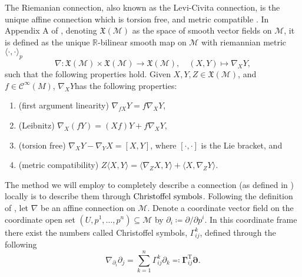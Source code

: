\begin{definition}\label{def:riemannian_connection}
    The \textup{Riemanian connection}, also known as the \textup{Levi-Civita connection}, is the unique affine connection which is torsion free, and metric compatible \cite[Def.~6.4]{Tu2017}. In Appendix A of \cite{JensenZimmermann2024}, denoting $\mathfrak{X}(\mathcal{M})$ as the space of smooth vector fields on $\mathcal{M}$, it is defined as the unique $\mathbb{R}$-bilinear smooth map on $\mathcal{M}$ with riemannian metric $\langle \cdot, \cdot\rangle_{p}$
    \begin{equation*}
        \nabla:\mathfrak{X}(\mathcal{M})\times \mathfrak{X}(\mathcal{M})\xrightarrow{}\mathfrak{X}(\mathcal{M}),\quad (X,Y)\mapsto \nabla_{X}Y,
    \end{equation*}
    such that the following properties hold. Given $X,Y,Z\in \mathfrak{X}(\mathcal{M})$, and $f\in \mathcal{C}^{\infty}(M)$, $\nabla_{X}Y$has the following properties:
    \begin{enumerate}
        \item (first argument linearity) $\nabla_{fX}Y=f \nabla_{X}Y$, 
        \item {}(Leibnitz) $\nabla_{X}(fY)=(Xf)Y+f \nabla_{X}Y$, 
        \item (torsion free) $\nabla_{X}Y-\nabla_{Y}X=[X,Y]$, where $[\cdot,\cdot]$ is the Lie bracket, and
        \item (metric compatibility) $Z \langle X,Y\rangle=\langle \nabla_{Z}X,Y\rangle+\langle X,\nabla_{Z}Y\rangle$.
    \end{enumerate}
\end{definition}

\begin{definition}\label{def:christoffel_symbols}
    The method we will employ to completely describe a connection (as defined in ) locally is to describe them through $\textup{Christoffel symbols}$. Following the definition of \cite[p.~100]{Tu2017}, let $\nabla$ be an affine connection on $\mathcal{M}$. Denote a coordinate vector field on the coordinate open set $(U,p^{1},\dots,p^{n})\subseteq\mathcal{M}$ by $\partial_{i}\coloneqq \partial/\partial p^i$. In this coordinate frame there exist the numbers called Christoffel symbols, $\Gamma_{ij}^{k}$, defined through the following
    \begin{equation*}
        \nabla_{\partial_{i}}\partial_{j}=\sum\limits_{k=1}^{n}\Gamma_{ij}^{k}\partial_{k}\eqqcolon\mathbf{\Gamma}_{ij}^{\mathrm{T}}\mathbf{\partial}.    
    \end{equation*}
\end{definition}

